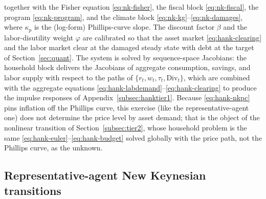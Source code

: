 \documentclass[12pt]{article}
\makeatletter
\newcommand{\FloatBarrier}{\par
    \begingroup\let\@elt\relax
    \edef\reserved@a{\@deferlist}\endgroup
    \ifx\reserved@a\@empty\else\clearpage\fi}
\newcommand{\vphi}{\varphi}
\makeatother
\begin{document}
together with the Fisher equation \eqref{eq:nk-fisher}, the fiscal block
\eqref{eq:nk-fiscal}, the program \eqref{eq:nk-program}, and the climate
block \eqref{eq:nk-kg}--\eqref{eq:nk-damages}, where $\kappa_p$ is the
(log-form) Phillips-curve slope. The discount factor $\beta$ and the
labor-disutility weight $\vphi$ are calibrated so that the asset market
\eqref{eq:hank-clearing} and the labor market clear at the damaged steady
state with debt at the target of Section~\ref{sec:quant}. The system is
solved by sequence-space Jacobians: the household block delivers the
Jacobians of aggregate consumption, savings, and labor supply with respect
to the paths of $\{r_t,w_t,\tau_t,\mathrm{Div}_t\}$, which are combined with
the aggregate equations \eqref{eq:hank-labdemand}--\eqref{eq:hank-clearing}
to produce the impulse responses of
Appendix~\ref{subsec:hanktier1}. Because \eqref{eq:hank-nkpc} pins inflation
off the Phillips curve, this exercise (like the representative-agent one) does not determine the price level by asset demand; that is the
object of the nonlinear transition of Section~\ref{subsec:tier2}, whose
household problem is the same \eqref{eq:hank-euler}--\eqref{eq:hank-budget}
solved globally with the price path, not the Phillips curve, as the unknown.

\FloatBarrier
\subsection{Representative-agent New Keynesian transitions}
\label{subsec:ranktrans}
\end{document}
